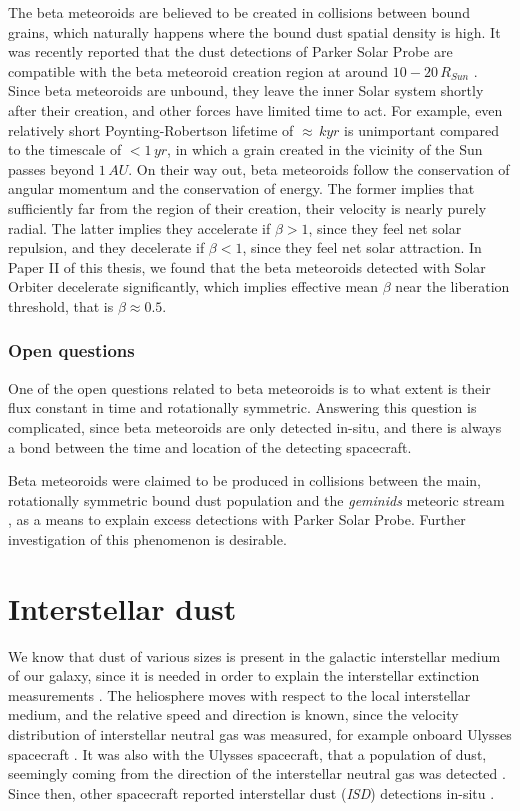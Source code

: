 The beta meteoroids are believed to be created in collisions between bound grains, which naturally happens where the bound dust spatial density is high. It was recently reported that the dust detections of Parker Solar Probe are compatible with the beta meteoroid creation region at around $10 - 20 \, R_{Sun}$ \citep{szalay2021collisional}. Since beta meteoroids are unbound, they leave the inner Solar system shortly after their creation, and other forces have limited time to act. For example, even relatively short Poynting-Robertson lifetime of $\approx \, kyr$ is unimportant compared to the timescale of $< 1 \, \si{yr}$, in which a grain created in the vicinity of the Sun passes beyond $1 \, \si{AU}$. On their way out, beta meteoroids follow the conservation of angular momentum and the conservation of energy. The former implies that sufficiently far from the region of their creation, their velocity is nearly purely radial. The latter implies they accelerate if $\beta > 1$, since they feel net solar repulsion, and they decelerate if $\beta < 1$, since they feel net solar attraction. In Paper II of this thesis, we found that the beta meteoroids detected with Solar Orbiter decelerate significantly, which implies effective mean $\beta$ near the liberation threshold, that is $\beta \approx 0.5$. 

\subsubsection{Open questions}

One of the open questions related to beta meteoroids is to what extent is their flux constant in time and rotationally symmetric. Answering this question is complicated, since beta meteoroids are only detected in-situ, and there is always a bond between the time and location of the detecting spacecraft. 

Beta meteoroids were claimed to be produced in collisions between the main, rotationally symmetric bound dust population and the \textit{geminids} meteoric stream \citep{szalay2021collisional}, as a means to explain excess detections with Parker Solar Probe. Further investigation of this phenomenon is desirable.

\section{Interstellar dust}

We know that dust of various sizes is present in the galactic interstellar medium of our galaxy, since it is needed in order to explain the interstellar extinction measurements \citep{desert1990interstellar}. The heliosphere moves with respect to the local interstellar medium, and the relative speed and direction is known, since the velocity distribution of interstellar neutral gas was measured, for example onboard Ulysses spacecraft \citep{witte2004kinetic}. It was also with the Ulysses spacecraft, that a population of dust, seemingly coming from the direction of the interstellar neutral gas was detected \citep{grun1993discovery}. Since then, other spacecraft reported interstellar dust (\textit{ISD}) detections in-situ \citep{zaslavsky2012interplanetary,malaspina2014interplanetary}. 

